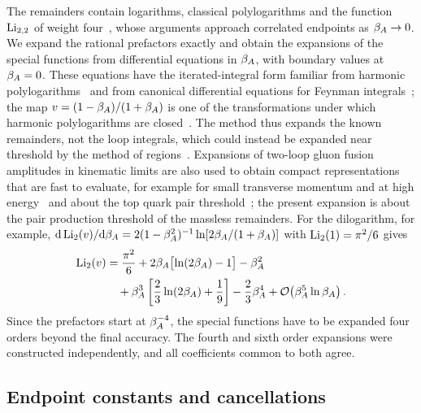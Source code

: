 The remainders contain logarithms, classical polylogarithms and the function $\operatorname{Li}_{2,2}$ of weight four~\cite{Frellesvig:2016ske,Vollinga:2004sn}, whose arguments approach correlated endpoints as $\beta_A\to0$. We expand the rational prefactors exactly and obtain the expansions of the special functions from differential equations in $\beta_A$, with boundary values at $\beta_A=0$. These equations have the iterated-integral form familiar from harmonic polylogarithms~\cite{RemiddiVermaseren2000} and from canonical differential equations for Feynman integrals~\cite{Henn2013}; the map $v=(1-\beta_A)/(1+\beta_A)$ is one of the transformations under which harmonic polylogarithms are closed~\cite{RemiddiVermaseren2000}.
The method thus expands the known remainders, not the loop integrals, which could instead be expanded near threshold by the method of regions~\cite{BenekeSmirnov1998}. Expansions of two-loop gluon fusion amplitudes in kinematic limits are also used to obtain compact representations that are fast to evaluate, for example for small transverse momentum and at high energy~\cite{Bellafronte:2022,Davies:2023} and about the top quark pair threshold~\cite{Groeber:2018}; the present expansion is about the pair production threshold of the massless remainders.
For the dilogarithm, for example, $\mathrm{d}\operatorname{Li}_2(v)/\mathrm{d}\beta_A=2(1-\beta_A^2)^{-1}\ln[2\beta_A/(1+\beta_A)]$ with $\operatorname{Li}_2(1)=\pi^2/6$ gives
\begin{align}
 \operatorname{Li}_2(v)
 &=
 \frac{\pi^2}{6}
 +2\beta_A\bigl[\ln(2\beta_A)-1\bigr]
 -\beta_A^2
 \nonumber\\
 &\quad
 +\beta_A^3
 \left[
   \frac{2}{3}\ln(2\beta_A)
   +\frac{1}{9}
 \right]
 -\frac{2}{3}\beta_A^4
 +\mathcal{O}\!\left(\beta_A^5\ln\beta_A\right).
 \label{eq:li2-threshold-example}
\end{align}
Since the prefactors start at $\beta_A^{-4}$, the special functions have to be expanded four orders beyond the final accuracy. The fourth and sixth order expansions were constructed independently, and all coefficients common to both agree.

\subsection{Endpoint constants and cancellations}
\label{sec:cancellations}

